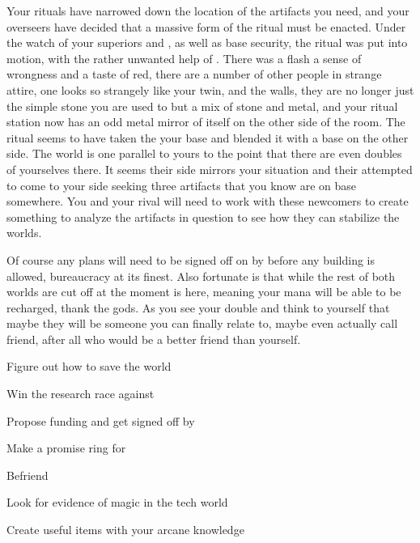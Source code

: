 \documentclass[char]{guildcamp3}
\begin{document}
Your rituals have narrowed down the location of the artifacts you need, and your overseers have decided that a massive form of the ritual must be enacted. Under the watch of your superiors \cNobleOne{\intro} and \cNobleTwo{\intro}, as well as base security, the ritual was put into motion, with the rather unwanted help of \cMageTwo{}. There was a flash a sense of wrongness and a taste of red, there are a number of other people in strange attire, one looks so strangely like your twin, and the walls, they are no longer just the simple stone you are used to but a mix of stone and metal, and your ritual station now has an odd metal mirror of itself on the other side of the room. The ritual seems to have taken the your base and blended it with a base on the other side. The world is one parallel to yours to the point that there are even doubles of yourselves there. It seems their side mirrors your situation and their attempted to come to your side seeking three artifacts that you know are on base somewhere. You and your rival will need to work with these newcomers to create something to analyze the artifacts in question to see how they can stabilize the worlds. 

Of course any plans will need to be signed off on by \cNobleTwo{} before any building is allowed, bureaucracy at its finest. Also fortunate is that while the rest of both worlds are cut off at the moment \cPaladin{} is here, meaning your mana will be able to be recharged, thank the gods. As you see your double and think to yourself that maybe they will be someone you can finally relate to, maybe even actually call friend, after all who would be a better friend than yourself. 

\begin{itemz}[Goals]
  \item Figure out how to save the world
  \item Win the research race against \cMageTwo{}
  \item Propose funding and get signed off by \cNobleTwo{}
  \item Make a promise ring for \cNobleOne{} 
  \item Befriend \cSciTwo{}
  \item Look for evidence of magic in the tech world
  \item Create useful items with your arcane knowledge
\end{itemz}
%
\end{document}
